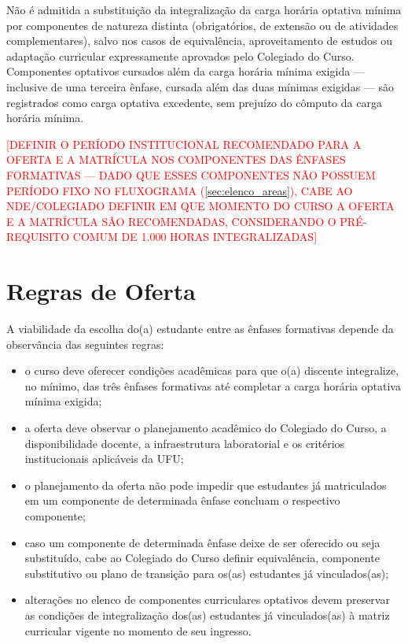 Não é admitida a substituição da integralização da carga horária optativa mínima por componentes de natureza distinta (obrigatórios, de extensão ou de atividades complementares), salvo nos casos de equivalência, aproveitamento de estudos ou adaptação curricular expressamente aprovados pelo Colegiado do Curso. Componentes optativos cursados além da carga horária mínima exigida — inclusive de uma terceira ênfase, cursada além das duas mínimas exigidas — são registrados como carga optativa excedente, sem prejuízo do cômputo da carga horária mínima.

\textcolor{red}{[DEFINIR O PERÍODO INSTITUCIONAL RECOMENDADO PARA A OFERTA E A MATRÍCULA NOS COMPONENTES DAS ÊNFASES FORMATIVAS — DADO QUE ESSES COMPONENTES NÃO POSSUEM PERÍODO FIXO NO FLUXOGRAMA (\autoref{sec:elenco_areas}), CABE AO NDE/COLEGIADO DEFINIR EM QUE MOMENTO DO CURSO A OFERTA E A MATRÍCULA SÃO RECOMENDADAS, CONSIDERANDO O PRÉ-REQUISITO COMUM DE 1.000 HORAS INTEGRALIZADAS]}

\section{Regras de Oferta}
\label{sec:regras_oferta}

A viabilidade da escolha do(a) estudante entre as ênfases formativas depende da observância das seguintes regras:

\begin{itemize}
    \item o curso deve oferecer condições acadêmicas para que o(a) discente integralize, no mínimo,  das três ênfases formativas até completar a carga horária optativa mínima exigida;
    \item a oferta deve observar o planejamento acadêmico do Colegiado do Curso, a disponibilidade docente, a infraestrutura laboratorial e os critérios institucionais aplicáveis da UFU;
    \item o planejamento da oferta não pode impedir que estudantes já matriculados em um componente de determinada ênfase concluam o respectivo componente;
    \item caso um componente de determinada ênfase deixe de ser oferecido ou seja substituído, cabe ao Colegiado do Curso definir equivalência, componente substitutivo ou plano de transição para os(as) estudantes já vinculados(as);
    \item alterações no elenco de componentes curriculares optativos devem preservar as condições de integralização dos(as) estudantes já vinculados(as) à matriz curricular vigente no momento de seu ingresso.
\end{itemize}

